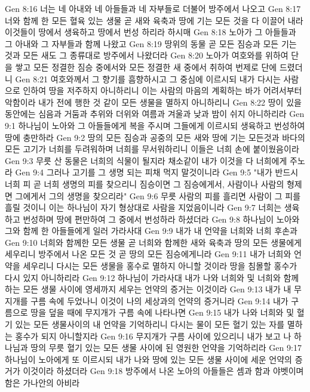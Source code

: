 Gen 8:16  너는 네 아내와 네 아들들과 네 자부들로 더불어 방주에서 나오고
Gen 8:17  너와 함께 한 모든 혈육 있는 생물 곧 새와 육축과 땅에 기는 모든 것을 다 이끌어 내라 이것들이 땅에서 생육하고 땅에서 번성 하리라 하시매
Gen 8:18  노아가 그 아들들과 그 아내와 그 자부들과 함께 나왔고
Gen 8:19  땅위의 동물 곧 모든 짐승과 모든 기는 것과 모든 새도 그 종류대로 방주에서 나왔더라
Gen 8:20  노아가 여호와를 위하여 단을 쌓고 모든 정결한 짐승 중에서와 모든 정결한 새 중에서 취하여 번제로 단에 드렸더니
Gen 8:21  여호와께서 그 향기를 흠향하시고 그 중심에 이르시되 내가 다시는 사람으로 인하여 땅을 저주하지 아니하리니 이는 사람의 마음의 계획하는 바가 어려서부터 악함이라 내가 전에 행한 것 같이 모든 생물을 멸하지 아니하리니
Gen 8:22  땅이 있을 동안에는 심음과 거둠과 추위와 더위와 여름과 겨울과 낮과 밤이 쉬지 아니하리라
Gen 9:1  하나님이 노아와 그 아들들에게 복을 주시며 그들에게 이르시되 생육하고 번성하여 땅에 충만하라
Gen 9:2  땅의 모든 짐승과 공중의 모든 새와 땅에 기는 모든것과 바다의 모든 고기가 너희를 두려워하며 너희를 무서워하리니 이들은 너희 손에 붙이웠음이라
Gen 9:3  무릇 산 동물은 너희의 식물이 될지라 채소같이 내가 이것을 다 너희에게 주노라
Gen 9:4  그러나 고기를 그 생명 되는 피채 먹지 말것이니라
Gen 9:5  "내가 반드시 너희 피 곧 너희 생명의 피를 찾으리니 짐승이면 그 짐승에게서, 사람이나 사람의 형제면 그에게서 그의 생명을 찾으리라"
Gen 9:6  무릇 사람의 피를 흘리면 사람이 그 피를 흘릴 것이니 이는 하나님이 자기 형상대로 사람을 지었음이니라
Gen 9:7  너희는 생육하고 번성하며 땅에 편만하여 그 중에서 번성하라 하셨더라
Gen 9:8  하나님이 노아와 그와 함께 한 아들들에게 일러 가라사대
Gen 9:9  내가 내 언약을 너희와 너희 후손과
Gen 9:10  너희와 함께한 모든 생물 곧 너희와 함께한 새와 육축과 땅의 모든 생물에게 세우리니 방주에서 나온 모든 것 곧 땅의 모든 짐승에게니라
Gen 9:11  내가 너희와 언약을 세우리니 다시는 모든 생물을 홍수로 멸하지 아니할 것이라 땅을 침몰할 홍수가 다시 있지 아니하리라
Gen 9:12  하나님이 가라사대 내가 나와 너희와 및 너희와 함께 하는 모든 생물 사이에 영세까지 세우는 언약의 증거는 이것이라
Gen 9:13  내가 내 무지개를 구름 속에 두었나니 이것이 나의 세상과의 언약의 증거니라
Gen 9:14  내가 구름으로 땅을 덮을 때에 무지개가 구름 속에 나타나면
Gen 9:15  내가 나와 너희와 및 혈기 있는 모든 생물사이의 내 언약을 기억하리니 다시는 물이 모든 혈기 있는 자를 멸하는 홍수가 되지 아니할지라
Gen 9:16  무지개가 구름 사이에 있으리니 내가 보고 나 하나님과 땅의 무릇 혈기 있는 모든 생물 사이에 된 영원한 언약을 기억하리라
Gen 9:17  하나님이 노아에게 또 이르시되 내가 나와 땅에 있는 모든 생물 사이에 세운 언약의 증거가 이것이라 하셨더라
Gen 9:18  방주에서 나온 노아의 아들들은 셈과 함과 야벳이며 함은 가나안의 아비라
